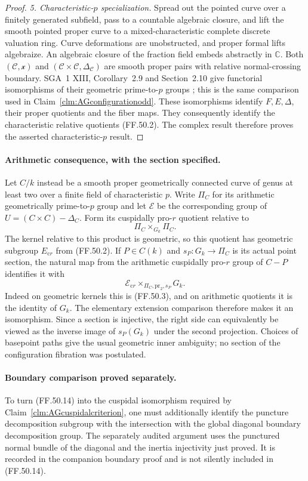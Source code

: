 \begin{proof}
\emph{5. Characteristic-\(p\) specialization.}
Spread out the pointed curve over a finitely generated
subfield, pass to a countable algebraic closure, and lift
the smooth pointed proper curve to a mixed-characteristic
complete discrete valuation ring. Curve deformations are
unobstructed, and proper formal lifts algebraize. An
algebraic closure of the fraction field embeds abstractly
in \(\mathbb C\). Both
\((\mathcal C,\mathcal x)\) and
\((\mathcal C\times\mathcal C,\Delta_{\mathcal C})\)
are smooth proper pairs with relative normal-crossing
boundary. SGA~1 XIII, Corollary~2.9 and Section~2.10 give
functorial isomorphisms of their geometric prime-to-\(p\)
groups \cite{AR_SGA1}; this is the same comparison used
in Claim~\ref{clm:AGconfigurationodd}.
These isomorphisms identify \(F,E,\Delta\), their proper
quotients and the fiber maps. They consequently identify
the characteristic relative quotients (FF.50.2).
The complex result therefore proves the asserted
characteristic-\(p\) result.
\end{proof}

\paragraph{Arithmetic consequence, with the section specified.}
Let \(C/k\) instead be a smooth proper geometrically
connected curve of genus at least two over a finite field
of characteristic \(p\). Write \(\Pi_C\) for its
arithmetic geometrically prime-to-\(p\) group and let
\(\mathcal E\) be the corresponding group of
\(U=(C\times C)-\Delta_C\). Form its cuspidally
pro-\(r\) quotient relative to
\[
                \Pi_C\times_{G_k}\Pi_C.
                                                        \tag{FF.50.13}
\]
The kernel relative to this product is geometric, so this
quotient has geometric subgroup \(E_{\mathrm{c}r}\)
from (FF.50.2). If \(P\in C(k)\) and
\(s_P:G_k\to\Pi_C\) is its actual point section,
the natural map from the arithmetic cuspidally pro-\(r\)
group of \(C-P\) identifies it with
\[
       \mathcal E_{\mathrm{c}r}
                  \times_{\Pi_C,\mathrm{pr}_2,s_P}G_k.
                                                        \tag{FF.50.14}
\]
Indeed on geometric kernels this is (FF.50.3), and on
arithmetic quotients it is the identity of \(G_k\).
The elementary extension comparison therefore makes it
an isomorphism. Since a section is injective, the right
side can equivalently be viewed as the inverse image of
\(s_P(G_k)\) under the second projection. Choices of
basepoint paths give the usual geometric inner ambiguity;
no section of the configuration fibration was postulated.

\paragraph{Boundary comparison proved separately.}
To turn (FF.50.14) into the cuspidal isomorphism required
by Claim~\ref{clm:AGcuspidalcriterion}, one must additionally
identify the puncture decomposition subgroup with the
intersection with the global diagonal boundary
decomposition group. The separately audited argument uses the
punctured normal bundle of the diagonal and the inertia
injectivity just proved. It is recorded in the companion
boundary proof and is not silently included in (FF.50.14).
